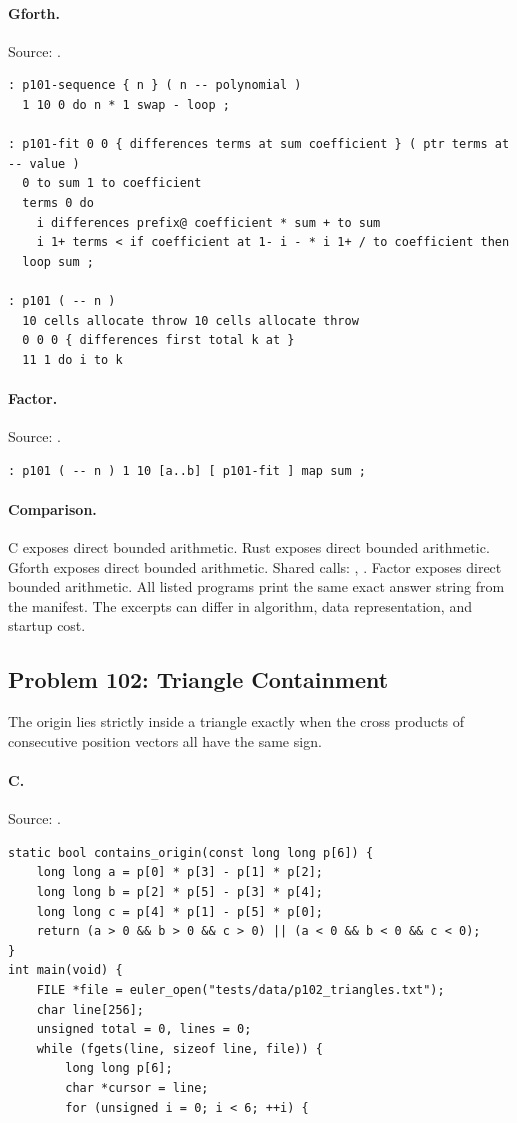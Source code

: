 \paragraph{Gforth.} Source: .
\begin{lstlisting}
: p101-sequence { n } ( n -- polynomial )
  1 10 0 do n * 1 swap - loop ;

: p101-fit 0 0 { differences terms at sum coefficient } ( ptr terms at -- value )
  0 to sum 1 to coefficient
  terms 0 do
    i differences prefix@ coefficient * sum + to sum
    i 1+ terms < if coefficient at 1- i - * i 1+ / to coefficient then
  loop sum ;

: p101 ( -- n )
  10 cells allocate throw 10 cells allocate throw
  0 0 0 { differences first total k at }
  11 1 do i to k
\end{lstlisting}

\paragraph{Factor.} Source: .
\begin{lstlisting}
: p101 ( -- n ) 1 10 [a..b] [ p101-fit ] map sum ;
\end{lstlisting}

\paragraph{Comparison.}
C exposes direct bounded arithmetic. Rust exposes direct bounded arithmetic. Gforth exposes direct bounded arithmetic. Shared calls: \texttt{}, \texttt{}. Factor exposes direct bounded arithmetic.
All listed programs print the same exact answer string from the manifest. The excerpts can differ in algorithm, data representation, and startup cost.

\subsection{Problem 102: Triangle Containment}
\label{walkthrough:p102}
The origin lies strictly inside a triangle exactly when the cross products of consecutive position vectors all have the same sign.

\paragraph{C.} Source: .
\begin{lstlisting}
static bool contains_origin(const long long p[6]) {
    long long a = p[0] * p[3] - p[1] * p[2];
    long long b = p[2] * p[5] - p[3] * p[4];
    long long c = p[4] * p[1] - p[5] * p[0];
    return (a > 0 && b > 0 && c > 0) || (a < 0 && b < 0 && c < 0);
}
int main(void) {
    FILE *file = euler_open("tests/data/p102_triangles.txt");
    char line[256];
    unsigned total = 0, lines = 0;
    while (fgets(line, sizeof line, file)) {
        long long p[6];
        char *cursor = line;
        for (unsigned i = 0; i < 6; ++i) {
\end{lstlisting}

